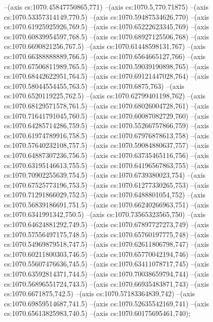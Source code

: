 --(axis cs:1070.45847750865,771)
--(axis cs:1070.5,770.71875)
--(axis cs:1070.53357314149,770.5)
--(axis cs:1070.59487534626,770)
--(axis cs:1070.61925925926,769.5)
--(axis cs:1070.65222623345,769)
--(axis cs:1070.60839954597,768.5)
--(axis cs:1070.68927125506,768)
--(axis cs:1070.6690821256,767.5)
--(axis cs:1070.61448598131,767)
--(axis cs:1070.66388888889,766.5)
--(axis cs:1070.6564665127,766)
--(axis cs:1070.67506811989,765.5)
--(axis cs:1070.59039190898,765)
--(axis cs:1070.68442622951,764.5)
--(axis cs:1070.69121447028,764)
--(axis cs:1070.58044554455,763.5)
--(axis cs:1070.6875,763)
--(axis cs:1070.6520119225,762.5)
--(axis cs:1070.62799401198,762)
--(axis cs:1070.68129571578,761.5)
--(axis cs:1070.68026004728,761)
--(axis cs:1070.71641791045,760.5)
--(axis cs:1070.60087082729,760)
--(axis cs:1070.64285714286,759.5)
--(axis cs:1070.55266757866,759)
--(axis cs:1070.61974789916,758.5)
--(axis cs:1070.67976878613,758)
--(axis cs:1070.57640232108,757.5)
--(axis cs:1070.59084880637,757)
--(axis cs:1070.64887307236,756.5)
--(axis cs:1070.63735465116,756)
--(axis cs:1070.63195146613,755.5)
--(axis cs:1070.64196567863,755)
--(axis cs:1070.70902255639,754.5)
--(axis cs:1070.6739380023,754)
--(axis cs:1070.67525773196,753.5)
--(axis cs:1070.61277330265,753)
--(axis cs:1070.71291866029,752.5)
--(axis cs:1070.6488801054,752)
--(axis cs:1070.56839186691,751.5)
--(axis cs:1070.66240266963,751)
--(axis cs:1070.6341991342,750.5)
--(axis cs:1070.73565323565,750)
--(axis cs:1070.64624881292,749.5)
--(axis cs:1070.67897727273,749)
--(axis cs:1070.57556497175,748.5)
--(axis cs:1070.65760197775,748)
--(axis cs:1070.54969879518,747.5)
--(axis cs:1070.62611806798,747)
--(axis cs:1070.60211800303,746.5)
--(axis cs:1070.65770042194,746)
--(axis cs:1070.55607476636,745.5)
--(axis cs:1070.63411078717,745)
--(axis cs:1070.63592814371,744.5)
--(axis cs:1070.70038659794,744)
--(axis cs:1070.56896551724,743.5)
--(axis cs:1070.66935483871,743)
--(axis cs:1070.6671875,742.5)
--(axis cs:1070.57183364839,742)
--(axis cs:1070.69859514687,741.5)
--(axis cs:1070.52635542169,741)
--(axis cs:1070.65613825983,740.5)
--(axis cs:1070.60175695461,740);

